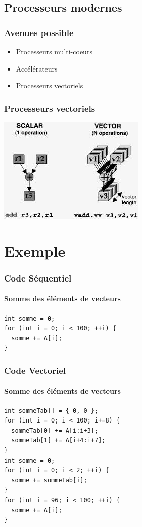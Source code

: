 \documentclass{beamer}
\begin{document}
\subsection{Processeurs modernes}
\begin{frame}
\frametitle{Avenues possible}
\begin{itemize}
\item Processeurs multi-coeurs
\item Accélérateurs
\item Processeurs vectoriels
\end{itemize}
\end{frame}

\begin{frame}
\frametitle{Processeurs vectoriels}
\begin{center}
\includegraphics[scale=0.85]{Vector.jpg}
\end{center}
\end{frame}

\section{Exemple}
\begin{frame}[fragile]
\frametitle{Code Séquentiel}
\framesubtitle{Somme des éléments de vecteurs}
\begin{lstlisting}
int somme = 0;
for (int i = 0; i < 100; ++i) {
  somme += A[i];
}
\end{lstlisting}
\end{frame}

\begin{frame}[fragile]
\frametitle{Code Vectoriel}
\framesubtitle{Somme des éléments de vecteurs}
\begin{lstlisting}
int sommeTab[] = { 0, 0 };
for (int i = 0; i < 100; i+=8) {
  sommeTab[0] += A[i:i+3]; 
  sommeTab[1] += A[i+4:i+7];
}
int somme = 0;
for (int i = 0; i < 2; ++i) {
  somme += sommeTab[i];
}
for (int i = 96; i < 100; ++i) {
  somme += A[i];
}
\end{lstlisting}
\end{frame}
\end{document}
